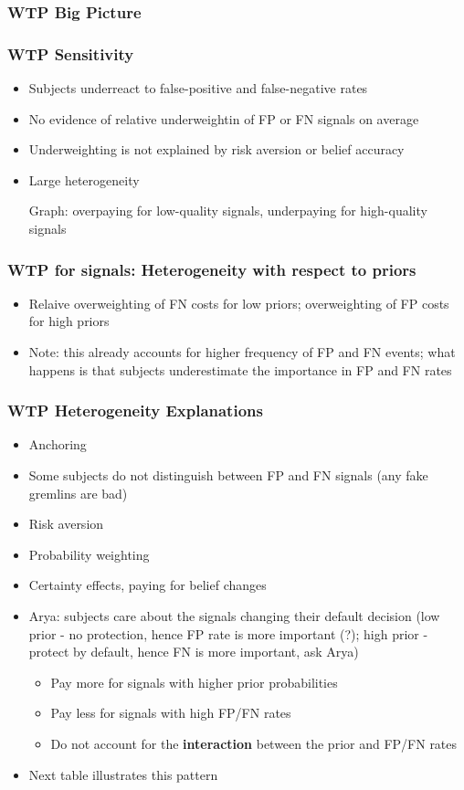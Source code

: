 \documentclass[11pt,hyperref={bookmarks=false}]{beamer}
\begin{document}
\begin{frame}
\frametitle{WTP Big Picture}
\small

\end{frame}


\begin{frame}
\frametitle{WTP Sensitivity}
\begin{itemize}
\item Subjects underreact to false-positive and false-negative rates
\item No evidence of relative underweightin of FP or FN signals on average
\item Underweighting is not explained by risk aversion or belief accuracy
\item Large heterogeneity
\item [Graph: overpaying for low-quality signals, underpaying for high-quality signals]
\end{itemize}
\footnotesize

\end{frame}



\begin{frame}
\frametitle{WTP for signals: Heterogeneity with respect to priors}
\begin{itemize}
\item Relaive overweighting of FN costs for low priors; overweighting of FP costs for high priors
\item Note: this already accounts for higher frequency of FP and FN events; what happens is that subjects underestimate the importance in FP and FN rates
\end{itemize}
\footnotesize

\end{frame}



\begin{frame}
\frametitle{WTP Heterogeneity Explanations}
\begin{itemize}
\item Anchoring
\item Some subjects do not distinguish between FP and FN signals (any fake gremlins are bad)
\item Risk aversion
\item Probability weighting
\item Certainty effects, paying for belief changes
\item Arya: subjects care about the signals changing their default decision (low prior - no protection, hence FP rate is more important (?); high prior - protect by default, hence FN is more important, ask Arya)
\begin{itemize}
\item Pay more for signals with higher prior probabilities
\item Pay less for signals with high FP/FN rates
\item Do not account for the \textbf{interaction} between the prior and FP/FN rates
\end{itemize}
\item Next table illustrates this pattern
\end{itemize}
\end{frame}
\end{document}
